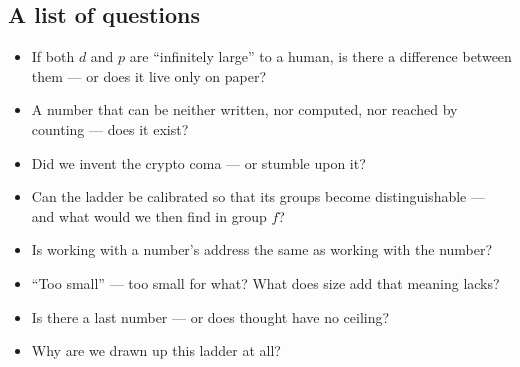 \subsection{A list of questions}
\begin{itemize}
  \item If both \(d\) and \(p\) are ``infinitely large'' to a human, is there a difference
        between them --- or does it live only on paper?
  \item A number that can be neither written, nor computed, nor reached by counting --- does
        it exist?
  \item Did we invent the crypto coma --- or stumble upon it?
  \item Can the ladder be calibrated so that its groups become distinguishable --- and
        what would we then find in group \(f\)?
  \item Is working with a number's address the same as working with the number?
  \item ``Too small'' --- too small for what? What does size add that meaning lacks?
  \item Is there a last number --- or does thought have no ceiling?
  \item Why are we drawn up this ladder at all?
\end{itemize}
